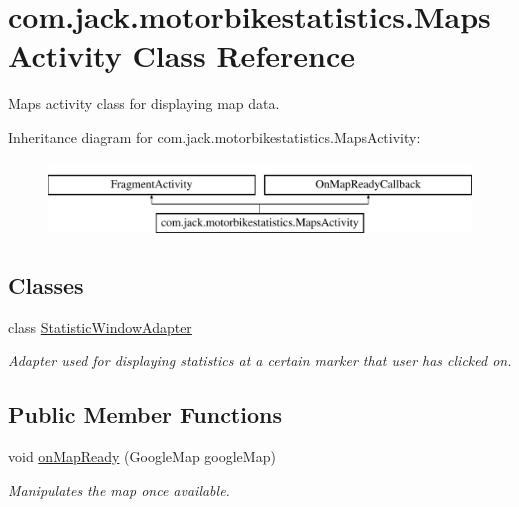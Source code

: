 \hypertarget{classcom_1_1jack_1_1motorbikestatistics_1_1_maps_activity}{}\section{com.\+jack.\+motorbikestatistics.\+Maps\+Activity Class Reference}
\label{classcom_1_1jack_1_1motorbikestatistics_1_1_maps_activity}


Maps activity class for displaying map data.  


Inheritance diagram for com.\+jack.\+motorbikestatistics.\+Maps\+Activity\+:\begin{figure}[H]
\begin{center}
\leavevmode
\includegraphics[height=2.000000cm]{classcom_1_1jack_1_1motorbikestatistics_1_1_maps_activity}
\end{center}
\end{figure}
\subsection*{Classes}
\begin{DoxyCompactItemize}
\item 
class \hyperlink{classcom_1_1jack_1_1motorbikestatistics_1_1_maps_activity_1_1_statistic_window_adapter}{Statistic\+Window\+Adapter}
\begin{DoxyCompactList}\small\item\em Adapter used for displaying statistics at a certain marker that user has clicked on. \end{DoxyCompactList}\end{DoxyCompactItemize}
\subsection*{Public Member Functions}
\begin{DoxyCompactItemize}
\item 
void \hyperlink{classcom_1_1jack_1_1motorbikestatistics_1_1_maps_activity_aefa35b548b2f39bb46b2cb5024be383c}{on\+Map\+Ready} (Google\+Map google\+Map)
\begin{DoxyCompactList}\small\item\em Manipulates the map once available. \end{DoxyCompactList}\end{DoxyCompactItemize}
